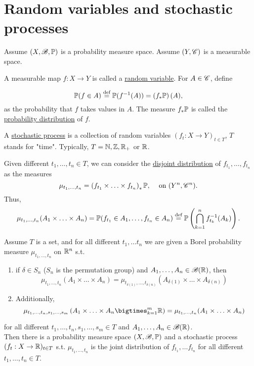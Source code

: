 \section{Random variables and stochastic processes}

Assume $(X,\mathscr{B},\mathbb{P})$ is a probability measure space. Assume $(Y,\mathscr{C})$ is a measurable space. 

A measurable map $f:X\rightarrow Y$ is called a \underline{random variable}. For $A\in\mathscr{C}$, define 

\[\mathbb{P}(f\in A) \stackrel{\text{def}}{=} \mathbb{P}(f^{-1}(A))=\left(f_* \mathbb{P}\right)(A), \] 
as the probability that $f$ takes values in $A$. The measure $f_*\mathbb{P}$ is called the \underline{probability distribution} of $f$.


\begin{definition}
    A \underline{stochastic process} is a collection of random variables $(f_t:X\rightarrow Y)_{t\in T}$, $T$ stands for "time". Typically, $T=\mathbb{N},\mathbb Z, \mathbb{R}_+$ or $\mathbb{R}$. 

    Given different $t_1,\ldots,t_n\in T$, we can consider the \underline{disjoint distribution} of $f_{t_1},\ldots, f_{t_n}$ as the measures
    \[\mu_{t_1,\ldots,t_n} = \left(f_{t_1}\times\ldots\times f_{t_n}\right)_*\mathbb{P}, \hspace{3mm}\text{ on }(Y^n,\mathscr{C}^n).\]
    Thus,
    \[\mu_{t_1,\ldots,t_n}(A_1\times\ldots\times A_n) = \mathbb{P}(f_{t_1}\in A_1,\ldots,f_{t_n}\in A_n)\stackrel{\text{def}}{=} \mathbb{P}\left(\bigcap_{k=1}^n f_{t_k}^{-1}(A_k)\right).\]
\end{definition}


\begin{theorem}
    Assume $T$ is a set, and for all different $t_1,\ldots t_n$ we are given a Borel probability measure $\mu_{t_1,\ldots,t_n} $ on $\mathbb{R}^n$ s.t.
    \begin{enumerate}
        \item if $\delta\in S_n$ ($S_n$ is the permutation group) and $A_1,\ldots, A_n\in \mathscr{B}(\mathbb{R})$, then 
        \[\mu_{t_1,\ldots,t_n}(A_1\times\ldots\times A_n) = \mu_{t_{\delta(1)},\ldots,t_{\delta(n)}}(A_{\delta(1)}\times\ldots\times A_{\delta(n)}) \]
        \item Additionally, \[\mu_{t_1,\ldots,t_n,s_1,\ldots, s_m}\left(A_1\times\ldots\times A_n\bigtimes_{k=1}^m \R\right) = \mu_{t_1,\ldots,t_n}(A_1\times\ldots\times A_n)\]
    \end{enumerate}
    for all different $t_1,\ldots,t_n,s_1,\ldots, s_m\in T$ and $A_1,\ldots,A_n\in\mathscr{B}(\mathbb{R})$.\\[3mm]

    Then there is a probability measure space $(X,\mathscr{B},\mathbb{P})$ and a stochastic process $(f_t:X\rightarrow \mathbb{R})_{t\in T}$ s.t. $\mu_{t_1,\ldots,t_n}$ is the joint distribution of $f_{t_1},\ldots f_{t_n}$ for all different $t_1,\ldots,t_n\in T$.
\end{theorem}

